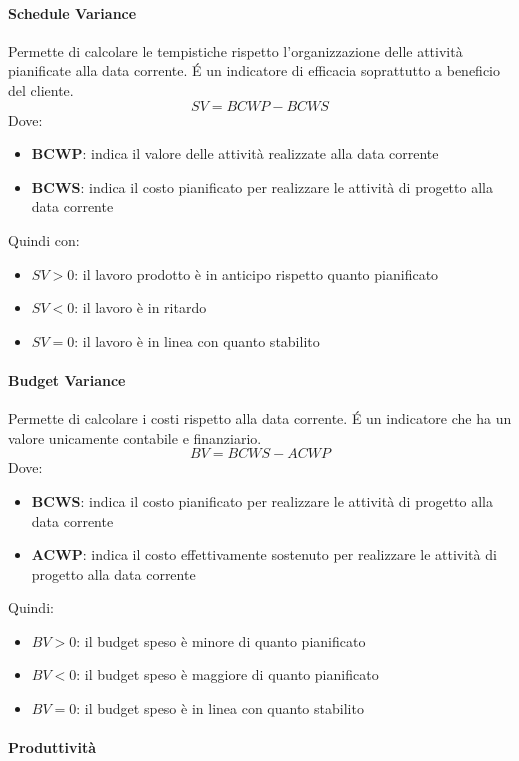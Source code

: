\paragraph{Schedule Variance}
Permette di calcolare le tempistiche rispetto l'organizzazione delle attività pianificate alla data
corrente. \'E un indicatore di efficacia soprattutto a beneficio del
cliente.
$$
SV = BCWP − BCWS
$$
Dove:
\begin{itemize}
\item \textbf{BCWP}: indica il valore delle attività realizzate alla data corrente
\item \textbf{BCWS}: indica il costo pianificato per realizzare le attività di progetto alla data corrente
\end{itemize}
Quindi con:
\begin{itemize}
\item $SV>0$: il lavoro prodotto è in anticipo rispetto quanto pianificato
\item $SV<0$: il lavoro è in ritardo
\item $SV=0$: il lavoro è in linea con quanto stabilito
\end{itemize}

\paragraph{Budget Variance}
Permette di calcolare i costi rispetto alla data corrente. \'E un indicatore che ha un valore
unicamente contabile e finanziario.
$$
BV = BCWS − ACWP
$$
Dove:
\begin{itemize}
\item \textbf{BCWS}: indica il costo pianificato per realizzare le attività di progetto alla data corrente
\item \textbf{ACWP}: indica il costo effettivamente sostenuto per realizzare le attività di progetto alla
  data corrente
\end{itemize}
Quindi:
\begin{itemize}
\item $BV>0$: il budget speso è minore di quanto pianificato
\item $BV<0$: il budget speso è maggiore di quanto pianificato
\item $BV=0$: il budget speso è in linea con quanto stabilito
\end{itemize}

\paragraph{Produttività}

